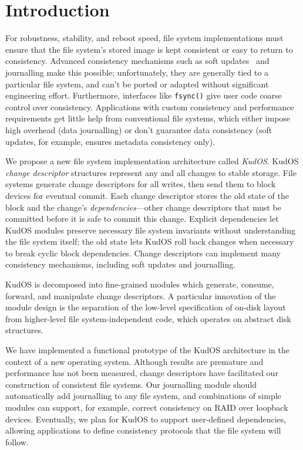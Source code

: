 
\section*{Introduction}
\label{sec:intro}

For robustness, stability, and reboot speed, file system implementations
must ensure that the file system's stored image is kept consistent
or easy to return to consistency.
%
Advanced consistency mechanisms such as soft updates~\cite{ganger00soft}
and journalling make this possible; unfortunately,
%
they are generally tied to a particular file system, and
can't be ported or adapted without significant engineering
effort.
%
Furthermore, interfaces like \verb+fsync()+ give user code coarse control
over consistency.
%
Applications with custom consistency and performance requirements get
little help from conventional file systems, which either impose high
overhead (data journalling) or don't guarantee data consistency (soft
updates, for example, ensures metadata consistency only).



We propose a new file system implementation architecture called
\emph{KudOS}.
%
KudOS \emph{change descriptor} structures represent any and all changes to
stable storage.
%
File systems generate change descriptors for all writes, then
send them to block devices for eventual commit.
%
Each change descriptor stores the old state of the block and the change's
\emph{dependencies}---other change descriptors that must be committed before
it is safe to commit this change.
%
Explicit dependencies let KudOS modules preserve necessary file system
invariants without understanding the file system itself; the old state
lets KudOS roll back changes when necessary to break cyclic block dependencies.
%
Change descriptors can implement many
consistency mechanisms, including soft updates and journalling.

KudOS is decomposed into fine-grained modules which generate, consume,
forward, and manipulate change descriptors. A particular innovation of the
module design is the separation of the low-level specification of on-disk layout
from higher-level file system-independent code, which operates on abstract disk
structures.

We have implemented a functional prototype of the KudOS
architecture in the context of a new operating system.
%
Although results are premature and performance has not been measured,
change descriptors have facilitated our construction of consistent file
systems.
%
Our journalling module should automatically add journalling to any file
system, and combinations of simple modules can support, for example,
correct consistency on RAID over loopback devices.
%
Eventually, we plan for KudOS to support user-defined dependencies,
allowing applications to define consistency protocols that the file system
will follow.


